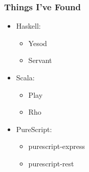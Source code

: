 \begin{frame}
  \frametitle{Things I've Found}
  \begin{itemize}
    \pause
    \item<+-> Haskell:
      \begin{itemize}
        \item<+-> Yesod
        \item<+-> Servant
      \end{itemize}
    \item<+-> Scala:
      \begin{itemize}
        \item<+-> Play
        \item<+-> Rho
      \end{itemize}
    \item<+-> PureScript:
      \begin{itemize}
        \item<+-> purescript-express
        \item<+-> purescript-rest
      \end{itemize}
  \end{itemize}
\end{frame}

